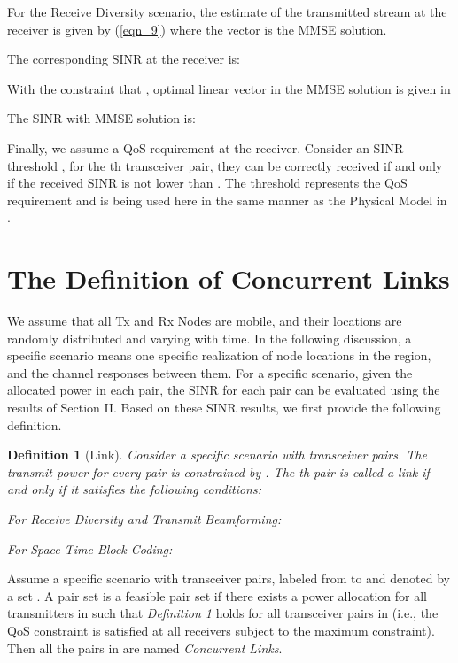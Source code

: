 \documentclass[draftcls,onecolumn,peerview,12pt]{IEEEtran}
\begin{document}
For the  Receive Diversity scenario, the estimate of the
transmitted stream  at the receiver is given by (\ref{eqn_9})
where the vector  is the MMSE solution.




The corresponding SINR at the receiver is:



With the constraint that ,
optimal linear vector  in the MMSE solution is given
in \cite{13_JointOptimal1998, 20_MMSE, 21_Spatial_Multiplexing}





The SINR with MMSE solution  is:


Finally, we assume a QoS requirement at the receiver. Consider an
SINR threshold , for the th transceiver pair, they can
be correctly received if and only if the received SINR is not lower
than . The threshold  represents the QoS
requirement and is being used here in the same manner as the
Physical Model in \cite{16_Gupta2000}.

\section{The Definition of Concurrent Links}
We assume that all Tx and Rx Nodes are mobile, and their locations
are randomly distributed and varying with time. In the following
discussion, a specific scenario means one specific realization of
node locations in the region, and the channel responses between
them. For a specific scenario, given the allocated power in each
pair, the SINR for each pair can be evaluated using the results of
Section II. Based on these SINR results, we first provide the
following definition.
\newtheorem{definition}{Definition}
\begin{definition}[Link]
Consider a specific scenario with  transceiver pairs. The
transmit power for every pair is constrained by . The th
pair  is called a \textit{link} if and only if it
satisfies the following conditions:

For  Receive Diversity and  Transmit
Beamforming:



For Space Time Block Coding:


\end{definition}

Assume a specific scenario with  transceiver pairs, labeled from
 to  and denoted by a set . A pair set
 is a feasible pair set if there exists a power
allocation for all transmitters in  such that
\textit{Definition 1} holds for all transceiver pairs in 
(i.e., the QoS constraint is satisfied at all receivers subject to
the maximum  constraint). Then all the pairs in  are named
\textit{Concurrent Links}.
\end{document}
